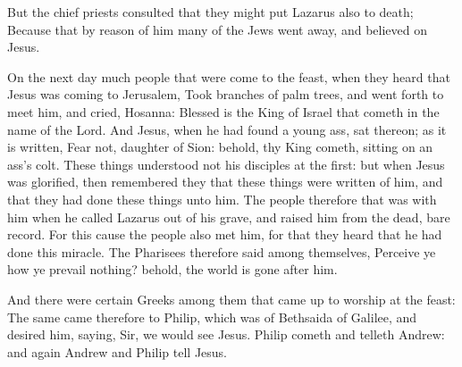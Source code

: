  But the chief priests consulted that they might put
Lazarus also to death;  Because that by reason of him
many of the Jews went away, and believed on Jesus.

 On the next day much people that were come to the feast,
when they heard that Jesus was coming to Jerusalem,  Took
branches of palm trees, and went forth to meet him, and cried, Hosanna:
Blessed is the King of Israel that cometh in the name of the Lord.
 And Jesus, when he had found a young ass, sat thereon;
as it is written,  Fear not, daughter of Sion: behold,
thy King cometh, sitting on an ass's colt.  These things
understood not his disciples at the first: but when Jesus was glorified,
then remembered they that these things were written of him, and that
they had done these things unto him.  The people
therefore that was with him when he called Lazarus out of his grave, and
raised him from the dead, bare record.  For this cause
the people also met him, for that they heard that he had done this
miracle.  The Pharisees therefore said among themselves,
Perceive ye how ye prevail nothing? behold, the world is gone after him.

 And there were certain Greeks among them that came up to
worship at the feast:  The same came therefore to Philip,
which was of Bethsaida of Galilee, and desired him, saying, Sir, we
would see Jesus.  Philip cometh and telleth Andrew: and
again Andrew and Philip tell Jesus.

